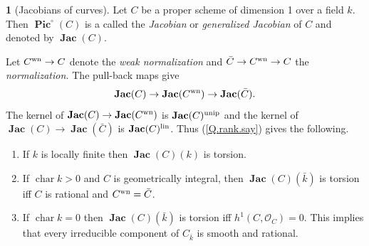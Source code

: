 \documentclass{amsart}
\theoremstyle{definition}
\newtheorem{say}[thm]{}
\theoremstyle{remark}
\renewcommand{\o}[0]{{\mathcal O}}
\newcommand{\pico}[0]{\operatorname{\mathbf{Pic}}^{\circ}}
\newcommand{\jacs}[0]{\operatorname{\mathbf{Jac}}}
\newcommand{\chr}[0]{\operatorname{char}}
\newcommand{\gm}[0]{{\mathbb G}_m}
\newcommand{\norm}[0]{\operatorname{norm}}
\begin{document}


 


\begin{say}[Jacobians of curves] \label{jac.say}
Let $C$ be a  proper scheme of dimension 1 over a field $k$. Then $\pico(C)$ is a called the {\it  Jacobian}  or  {\it generalized Jacobian}  of $C$  and denoted by
 $\jacs(C)$. 

Let $C^{\rm wn}\to C$ denote the {\it weak normalization} and
$\bar C\to C^{\rm wn}\to C$ the {\it normalization.}
The pull-back maps give
$$
\jacs(C)\to \jacs(C^{\rm wn})\to \jacs(\bar C).
$$
The kernel of $\jacs(C)\to \jacs(C^{\rm wn})$ is $\jacs(C)^{\rm unip}$ and
the  kernel of $\jacs(C)\to \jacs(\bar C)$ is $\jacs(C)^{\rm lin}$.
Thus  (\ref{Q.rank.say}) gives the following.
\begin{enumerate}
\item If $k$ is locally finite then $\jacs(C)(k)$ is torsion.
\item If $\chr k>0$ and $C$ is geometrically integral, then $\jacs(C)(\bar k)$ is torsion iff  $C$ is rational and $C^{\rm wn}=\bar C$. 
\item If $\chr k=0$ then $\jacs(C)(\bar k)$ is torsion iff 
$h^1(C, \o_C)=0$. This implies that 
every irreducible component of $C_{\bar k}$ is smooth and rational.
\end{enumerate}
\end{say}
\end{document}
